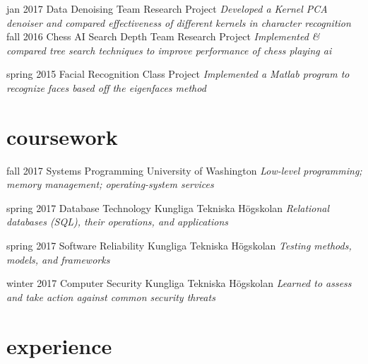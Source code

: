 \documentclass[]{friggeri-cv}
\begin{document}
\begin{entrylist}
  \entry
    {jan 2017}
    {Data Denoising}
    {Team Research Project}
    {\emph{Developed a Kernel PCA denoiser and compared effectiveness of different kernels in character recognition}}
  \entry
    {fall 2016}
    {Chess AI Search Depth}
    {Team Research Project}
    {\emph{Implemented \& compared tree search techniques to improve performance of chess playing ai}}

  \entry
    {spring 2015}
    {Facial Recognition}
    {Class Project}
    {\emph{Implemented a Matlab program to recognize faces based off the eigenfaces method}}
\end{entrylist}

\section{coursework}

\begin{entrylist}

  \entry
    {fall 2017}
    {Systems Programming}
    {University of Washington}
    {\emph{Low-level programming; memory management; operating-system services}}


  \entry
    {spring 2017}
    {Database Technology}
    {Kungliga Tekniska Högskolan}
    {\emph{Relational databases (SQL), their operations, and applications}}

  \entry
    {spring 2017}
    {Software Reliability}
    {Kungliga Tekniska Högskolan}
    {\emph{Testing methods, models, and frameworks}}

  \entry
    {winter 2017}
    {Computer Security}
    {Kungliga Tekniska Högskolan}
    {\emph{Learned to assess and take action against common security threats}}


\end{entrylist}

\section{experience}
\end{document}
